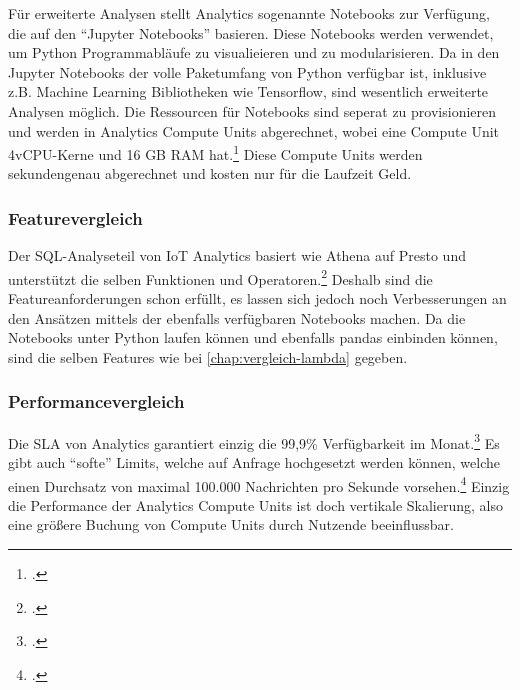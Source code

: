 Für erweiterte Analysen stellt \AWSIOT Analytics sogenannte Notebooks zur Verfügung, die auf den \enquote{Jupyter Notebooks} basieren. Diese Notebooks werden verwendet, um Python Programmabläufe zu visualieieren und zu modularisieren. Da in den Jupyter Notebooks der volle Paketumfang von Python verfügbar ist, inklusive z.B. Machine Learning Bibliotheken wie Tensorflow, sind wesentlich erweiterte Analysen möglich. Die Ressourcen für Notebooks sind seperat zu provisionieren und werden in Analytics Compute Units abgerechnet, wobei eine Compute Unit 4vCPU-Kerne und 16 GB \ac{RAM} hat.\footcite[Vgl.][]{AmazonWebServicesInc..o.J.i} Diese Compute Units werden sekundengenau abgerechnet und kosten nur für die Laufzeit Geld.

\subsubsection{Featurevergleich}
Der \ac{SQL}-Analyseteil von IoT Analytics basiert wie Athena auf Presto und unterstützt die selben Funktionen und Operatoren.\footcite[Vgl.][]{AmazonWebServicesInc..o.J.au} Deshalb sind die Featureanforderungen schon erfüllt, es lassen sich jedoch noch Verbesserungen an den Ansätzen mittels der ebenfalls verfügbaren Notebooks machen.
Da die Notebooks unter Python laufen können und ebenfalls pandas einbinden können, sind die selben Features wie bei \autoref{chap:vergleich-lambda} gegeben.


\subsubsection{Performancevergleich}
Die \ac{SLA} von \AWSIOT Analytics garantiert einzig die 99,9\% Verfügbarkeit im Monat.\footcite[Vgl.][]{AmazonWebServicesInc..2019f} Es gibt auch \enquote{softe} Limits, welche auf Anfrage hochgesetzt werden können, welche einen Durchsatz von maximal 100.000 Nachrichten pro Sekunde vorsehen.\footcite[Vgl][]{AmazonWebServicesInc..o.J.av} Einzig die Performance der Analytics Compute Units ist doch vertikale Skalierung, also eine größere Buchung von Compute Units durch Nutzende beeinflussbar.


